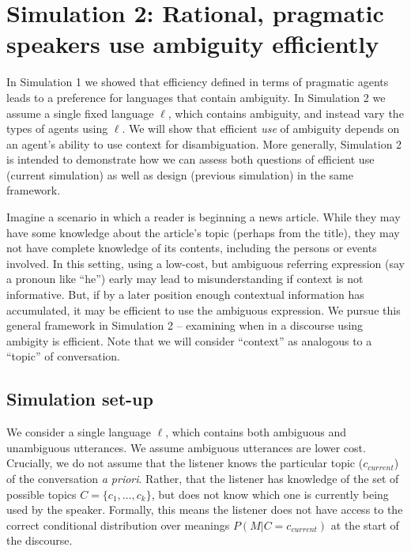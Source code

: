 \documentclass[10pt, letterpaper]{article}
\begin{document}
\section{Simulation 2: Rational, pragmatic speakers use ambiguity
efficiently}\label{simulation-2-rational-pragmatic-speakers-use-ambiguity-efficiently}

In Simulation 1 we showed that efficiency defined in terms of pragmatic
agents leads to a preference for languages that contain ambiguity. In
Simulation 2 we assume a single fixed language \(\ell\), which contains
ambiguity, and instead vary the types of agents using \(\ell\). We will
show that efficient \emph{use} of ambiguity depends on an agent's
ability to use context for disambiguation. More generally, Simulation 2
is intended to demonstrate how we can assess both questions of efficient
use (current simulation) as well as design (previous simulation) in the
same framework.\par

Imagine a scenario in which a reader is beginning a news article. While
they may have some knowledge about the article's topic (perhaps from the
title), they may not have complete knowledge of its contents, including
the persons or events involved. In this setting, using a low-cost, but
ambiguous referring expression (say a pronoun like ``he'') early may
lead to misunderstanding if context is not informative. But, if by a
later position enough contextual information has accumulated, it may be
efficient to use the ambiguous expression. We pursue this general
framework in Simulation 2 -- examining when in a discourse using
ambigity is efficient. Note that we will consider ``context'' as
analogous to a ``topic'' of conversation. \par

\subsection{Simulation set-up}\label{simulation-set-up-1}

We consider a single language \(\ell\), which contains both ambiguous
and unambiguous utterances. We assume ambiguous utterances are lower
cost. Crucially, we do not assume that the listener knows the particular
topic (\(c_{current}\)) of the conversation \textit{a priori}. Rather,
that the listener has knowledge of the set of possible topics
\(C = \{c_1, \dots, c_k\}\), but does not know which one is currently
being used by the speaker. Formally, this means the listener does not
have access to the correct conditional distribution over meanings
\(P(M|C=c_{current})\) at the start of the discourse.\par 
\end{document}
